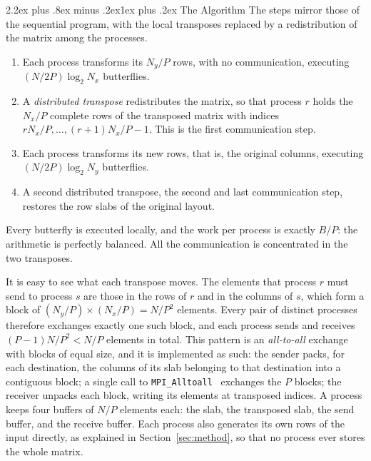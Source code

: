 \documentclass[conference,onecolumn]{IEEEtran}
\makeatletter
\renewcommand{\subsection}{\@startsection{subsection}{2}{\z@}%
  {2.2ex plus .8ex minus .2ex}{1ex plus .2ex}%
  {\normalfont\normalsize\bfseries}}
\theoremstyle{course}
\makeatother
\begin{document}
\subsection{The Algorithm}
The steps mirror those of the sequential program, with the local transposes
replaced by a redistribution of the matrix among the processes.
\begin{enumerate}
\itemsep1pt
\item Each process transforms its $N_y/P$ rows, with no communication,
executing $(N/2P)\log_2 N_x$ butterflies.
\item A \emph{distributed transpose} redistributes the matrix, so that
process $r$ holds the $N_x/P$ complete rows of the transposed matrix with
indices $rN_x/P,\ldots,(r+1)N_x/P-1$. This is the first communication
step.
\item Each process transforms its new rows, that is, the original columns,
executing $(N/2P)\log_2 N_y$ butterflies.
\item A second distributed transpose, the second and last communication
step, restores the row slabs of the original layout.
\end{enumerate}
Every butterfly is executed locally, and the work per process is exactly
$B/P$: the arithmetic is perfectly balanced. All the communication is
concentrated in the two transposes.

It is easy to see what each transpose moves. The elements that process $r$
must send to process $s$ are those in the rows of $r$ and in the columns of
$s$, which form a block of $(N_y/P)\times(N_x/P)=N/P^2$ elements. Every
pair of distinct processes therefore exchanges exactly one such block, and
each process sends and receives $(P-1)N/P^2<N/P$ elements in total. This
pattern is an \emph{all-to-all} exchange with blocks of equal size, and it
is implemented as such: the sender packs, for each destination, the columns
of its slab belonging to that destination into a contiguous block; a single
call to \texttt{MPI\_Alltoall}~\cite{mpi} exchanges the $P$ blocks; the
receiver unpacks each block, writing its elements at transposed indices. A
process keeps four buffers of $N/P$ elements each: the slab, the transposed
slab, the send buffer, and the receive buffer. Each process also generates
its own rows of the input directly, as explained in Section~\ref{sec:method},
so that no process ever stores the whole matrix.
\end{document}
